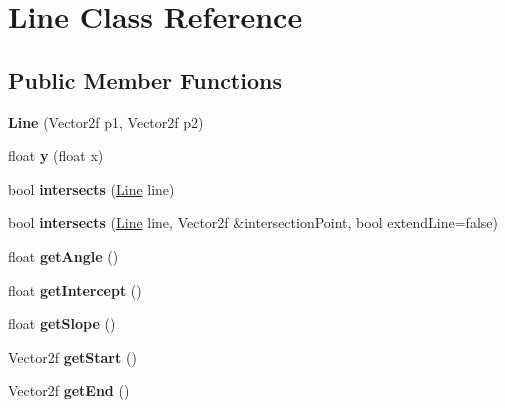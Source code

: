 \hypertarget{class_line}{}\section{Line Class Reference}
\label{class_line}
\subsection*{Public Member Functions}
\begin{DoxyCompactItemize}
\item 
\mbox{\label{class_line_a14086366b8143477126e1e707c39c926}} 
{\bfseries Line} (Vector2f p1, Vector2f p2)
\item 
\mbox{\label{class_line_a5d43019cccd837ec42290bea0e2ad17a}} 
float {\bfseries y} (float x)
\item 
\mbox{\label{class_line_a34a6df58140aa191f8c4718ccd613aeb}} 
bool {\bfseries intersects} (\mbox{\hyperlink{class_line}{Line}} line)
\item 
\mbox{\label{class_line_a69d1d2dabe536f41bff826effa84ac6e}} 
bool {\bfseries intersects} (\mbox{\hyperlink{class_line}{Line}} line, Vector2f \&intersection\+Point, bool extend\+Line=false)
\item 
\mbox{\label{class_line_ace99d3c925c8b71cb967188c029879e7}} 
float {\bfseries get\+Angle} ()
\item 
\mbox{\label{class_line_a9ed298f661aa86dc50099ba2bbf035d2}} 
float {\bfseries get\+Intercept} ()
\item 
\mbox{\label{class_line_a982898ab2cf3a5e4d7a18c7b6f985492}} 
float {\bfseries get\+Slope} ()
\item 
\mbox{\label{class_line_a535f3ce12c85a6cccfc183967b082b83}} 
Vector2f {\bfseries get\+Start} ()
\item 
\mbox{\label{class_line_a0cddf1496f2b5efd58ea1484631d0cbc}} 
Vector2f {\bfseries get\+End} ()
\item 
\mbox{\label{class_line_a9764252ce3d039cba826643eb87f74e5}} 

\end{DoxyCompactItemize}
